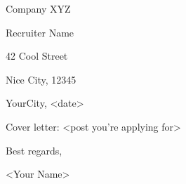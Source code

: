 \documentclass[10pt]{article}
\newcommand{\customtopmargin}{%
  \vspace{5em}%
}
\newlength{\lmspace}
\newcommand{\vertskip}{ \vspace{3ex} }
\begin{document}
\begin{minipage}[c][\textheight][t]{.70\textwidth-3\lmspace}
 \customtopmargin
 Company XYZ

 Recruiter Name

 42 Cool Street

 Nice City, 12345

 \vspace{3ex}

 YourCity, <date>

 \vspace{3ex}

 Cover letter: <post you're applying for>

 \vspace{8ex}

 \lipsum[1]
 \vertskip

 \lipsum[2]
 \vertskip

 \lipsum[3]
 \vspace{5ex}

 Best regards,
 \vspace{2ex}

 <Your Name>
\end{minipage}
\end{document}
